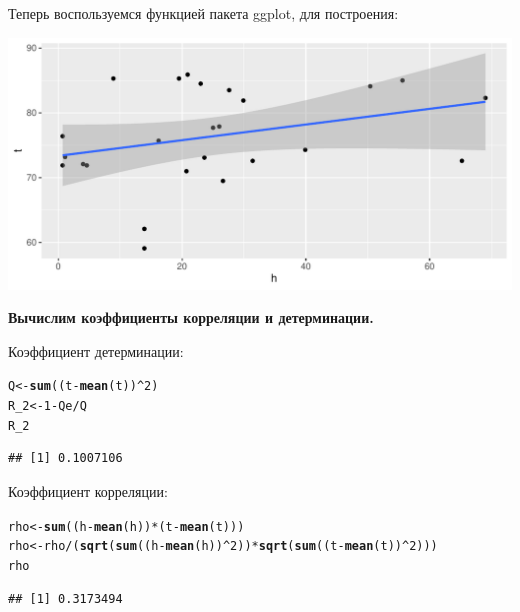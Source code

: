 \documentclass{article}\usepackage[]{graphicx}\usepackage[]{color}
\makeatletter
\def\maxwidth{ %
  \ifdim\Gin@nat@width>\linewidth
    \linewidth
  \else
    \Gin@nat@width
  \fi
}
\newcommand{\hlnum}[1]{\textcolor[rgb]{0.686,0.059,0.569}{#1}}%
\newcommand{\hlopt}[1]{\textcolor[rgb]{0,0,0}{#1}}%
\newcommand{\hlstd}[1]{\textcolor[rgb]{0.345,0.345,0.345}{#1}}%
\newcommand{\hlkwb}[1]{\textcolor[rgb]{0.69,0.353,0.396}{#1}}%
\newcommand{\hlkwd}[1]{\textcolor[rgb]{0.737,0.353,0.396}{\textbf{#1}}}%
\newenvironment{kframe}{%
 \def\at@end@of@kframe{}%
 \ifinner\ifhmode%
  \def\at@end@of@kframe{\end{minipage}}%
  \begin{minipage}{\columnwidth}%
 \fi\fi%
 \def\FrameCommand##1{\hskip\@totalleftmargin \hskip-\fboxsep
 \colorbox{shadecolor}{##1}\hskip-\fboxsep
     \hskip-\linewidth \hskip-\@totalleftmargin \hskip\columnwidth}%
 \MakeFramed {\advance\hsize-\width
   \@totalleftmargin\z@ \linewidth\hsize
   \@setminipage}}%
 {\par\unskip\endMakeFramed%
 \at@end@of@kframe}
\newenvironment{knitrout}{}{} %
\makeatother
\begin{document}
Теперь воспользуемся функцией пакета ggplot, для построения:

\begin{knitrout}
\color{fgcolor}
\includegraphics[width=\maxwidth]{figure/unnamed-chunk-8-1} 

\end{knitrout}

\newpage

\textbf{Вычислим коэффициенты корреляции и детерминации.}

Коэффициент детерминации:
\begin{knitrout}
\color{fgcolor}\begin{kframe}
\begin{alltt}
\hlstd{Q} \hlkwb{<-} \hlkwd{sum}\hlstd{((t} \hlopt{-} \hlkwd{mean}\hlstd{(t))}\hlopt{^}\hlnum{2}\hlstd{)}
\hlstd{R_2} \hlkwb{<-} \hlnum{1} \hlopt{-} \hlstd{Qe} \hlopt{/} \hlstd{Q}
\hlstd{R_2}
\end{alltt}
\begin{verbatim}
## [1] 0.1007106
\end{verbatim}
\end{kframe}
\end{knitrout}
Коэффициент корреляции:
\begin{knitrout}
\color{fgcolor}\begin{kframe}
\begin{alltt}
\hlstd{rho} \hlkwb{<-} \hlkwd{sum}\hlstd{((h} \hlopt{-} \hlkwd{mean}\hlstd{(h))} \hlopt{*} \hlstd{(t} \hlopt{-} \hlkwd{mean}\hlstd{(t)))}
\hlstd{rho} \hlkwb{<-} \hlstd{rho} \hlopt{/} \hlstd{(}\hlkwd{sqrt}\hlstd{(}\hlkwd{sum}\hlstd{((h} \hlopt{-} \hlkwd{mean}\hlstd{(h))}\hlopt{^}\hlnum{2}\hlstd{))} \hlopt{*} \hlkwd{sqrt}\hlstd{(}\hlkwd{sum}\hlstd{((t} \hlopt{-} \hlkwd{mean}\hlstd{(t))}\hlopt{^}\hlnum{2}\hlstd{)))}
\hlstd{rho}
\end{alltt}
\begin{verbatim}
## [1] 0.3173494
\end{verbatim}
\end{kframe}
\end{knitrout}
\end{document}

